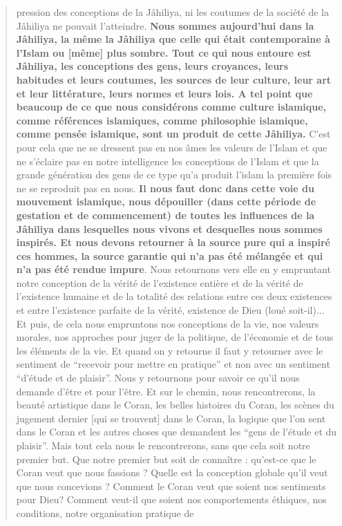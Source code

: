\begin{quote}
pression des conceptions de la Jâhiliya, ni les coutumes de la société
de la Jâhiliya ne pouvait l'atteindre. \textbf{Nous sommes aujourd'hui
dans la Jâhiliya, la même la Jâhiliya que celle qui était contemporaine
à l'Islam ou {[}même{]} plus sombre. Tout ce qui nous entoure est
Jâhiliya, les conceptions des gens, leurs croyances, leurs habitudes et
leurs coutumes, les sources de leur culture, leur art et leur
littérature, leurs normes et leurs lois. A tel point que beaucoup de ce
que nous considérons comme culture islamique, comme références
islamiques, comme philosophie islamique, comme pensée islamique, sont un
produit de cette Jâhiliya.} C'est pour cela que ne se dressent pas en
nos âmes les valeurs de l'Islam et que ne s'éclaire pas
en notre intelligence les conceptions de l'Islam et que la grande
génération des gens de ce type qu'a produit l'islam la première fois ne
se reproduit pas en nous. \textbf{Il nous faut donc dans cette voie du
mouvement islamique, nous dépouiller (dans cette période de gestation et
de commencement) de toutes les influences de la Jâhiliya dans lesquelles
nous vivons et desquelles nous sommes inspirés. Et nous devons retourner
à la source pure qui a inspiré ces hommes, la source garantie qui n'a
pas été mélangée et qui n'a pas été rendue impure}. Nous retournons vers
elle en y empruntant notre conception de la vérité de l'existence
entière et de la vérité de l'existence humaine et de la totalité des
relations entre ces deux existences et entre l'existence parfaite de la
vérité, existence de Dieu (loué soit-il)... Et puis, de cela nous
empruntons nos conceptions de la vie, nos valeurs morales, nos approches
pour juger de la politique, de l'économie et de tous les éléments de la
vie. Et quand on y retourne il faut y retourner avec le sentiment de
``recevoir pour mettre en pratique'' et non avec un sentiment ``d'étude
et de plaisir''. Nous y retournons pour savoir ce qu'il nous demande
d'être et pour l'être. Et sur le chemin, nous rencontrerons, la beauté
artistique dans le Coran, les belles histoires du Coran, les scènes du
jugement dernier {[}qui se trouvent{]} dans le Coran, la logique que
l'on sent dans le Coran et les autres choses que demandent les ``gens de
l'étude et du plaisir''. Mais tout cela nous le rencontrerons, sans que
cela soit notre premier but. Que notre premier but soit de connaître :
qu'est-ce que le Coran veut que nous fassions ? Quelle est la conception
globale qu'il veut que nous concevions ? Comment le Coran veut que
soient nos sentiments pour Dieu? Comment veut-il que soient nos
comportements éthiques, nos conditions, notre organisation pratique de

\end{quote}

